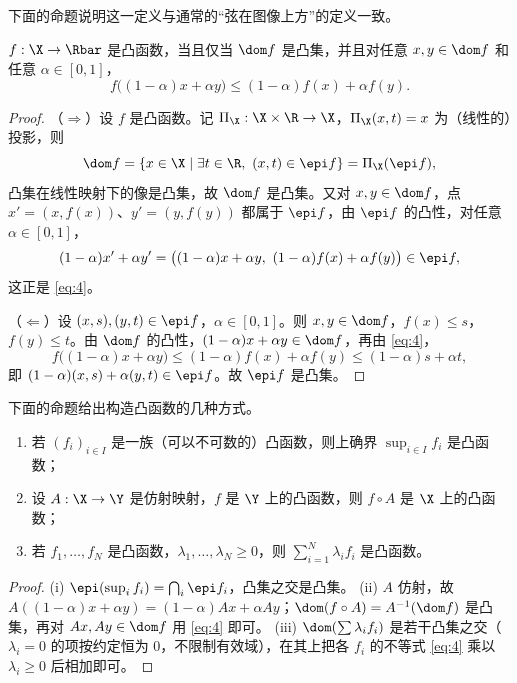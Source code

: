 下面的命题说明这一定义与通常的“弦在图像上方”的定义一致。

\begin{proposition}
\label{res:15}
$f:\X\to\Rbar$ 是凸函数，当且仅当 $\dom f$ 是凸集，并且对任意 $x,y\in\dom f$ 和任意 $\alpha\in[0,1]$，
\begin{equation}
  \label{eq:4}
  f\bigl((1-\alpha)x+\alpha y\bigr)\leqslant(1-\alpha)f(x)+\alpha f(y).
\end{equation}
\end{proposition}

\begin{proof}
（$\Rightarrow$）设 $f$ 是凸函数。记 $\Pi_\X:\X\times\R\to\X$，$\Pi_\X(x,t)=x$ 为（线性的）投影，则
\[
  \dom f = \{x\in\X \mid \exists t\in\R,\ (x,t)\in\epi f\} = \Pi_\X(\epi f),
\]
凸集在线性映射下的像是凸集，故 $\dom f$ 是凸集。又对 $x,y\in\dom f$，点 $x'=(x,f(x))$、$y'=(y,f(y))$ 都属于 $\epi f$，由 $\epi f$ 的凸性，对任意 $\alpha\in[0,1]$，
\[
  (1-\alpha)x'+\alpha y' = \bigl((1-\alpha)x+\alpha y,\ (1-\alpha)f(x)+\alpha f(y)\bigr)\in\epi f,
\]
这正是 \eqref{eq:4}。

（$\Leftarrow$）设 $(x,s),(y,t)\in\epi f$，$\alpha\in[0,1]$。则 $x,y\in\dom f$，$f(x)\leqslant s$，$f(y)\leqslant t$。由 $\dom f$ 的凸性，$(1-\alpha)x+\alpha y\in\dom f$，再由 \eqref{eq:4}，
\[
  f\bigl((1-\alpha)x+\alpha y\bigr)\leqslant(1-\alpha)f(x)+\alpha f(y)\leqslant(1-\alpha)s+\alpha t,
\]
即 $(1-\alpha)(x,s)+\alpha(y,t)\in\epi f$。故 $\epi f$ 是凸集。
\end{proof}

下面的命题给出构造凸函数的几种方式。

\begin{proposition}
\label{res:16}
\begin{enumerate}[label=(\roman*)]
  \item 若 $(f_i)_{i\in I}$ 是一族（可以不可数的）凸函数，则上确界 $\sup_{i\in I}f_i$ 是凸函数；
  \item 设 $A:\X\to\Y$ 是仿射映射，$f$ 是 $\Y$ 上的凸函数，则 $f\circ A$ 是 $\X$ 上的凸函数；
  \item 若 $f_1,\dots,f_N$ 是凸函数，$\lambda_1,\dots,\lambda_N\geqslant0$，则 $\sum_{i=1}^N\lambda_if_i$ 是凸函数。
\end{enumerate}
\end{proposition}

\begin{proof}
(i) $\epi(\sup_i f_i)=\bigcap_i\epi f_i$，凸集之交是凸集。
(ii) $A$ 仿射，故 $A((1-\alpha)x+\alpha y)=(1-\alpha)Ax+\alpha Ay$；$\dom(f\circ A)=A^{-1}(\dom f)$ 是凸集，再对 $Ax,Ay\in\dom f$ 用 \eqref{eq:4} 即可。
(iii) $\dom(\sum\lambda_if_i)$ 是若干凸集之交（$\lambda_i=0$ 的项按约定恒为 $0$，不限制有效域），在其上把各 $f_i$ 的不等式 \eqref{eq:4} 乘以 $\lambda_i\geqslant0$ 后相加即可。
\end{proof}


